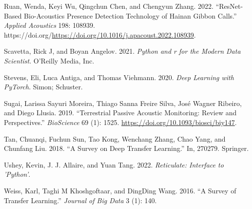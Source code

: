 \documentclass[fleqn,10pt,lineno]{wlpeerj} %
\newlength{\cslhangindent}
\newlength{\cslentryspacingunit} %
\newenvironment{CSLReferences}[2] %
 {%
  \setlength{\parindent}{0pt}
  \ifodd #1
  \let\oldpar\par
  \def\par{\hangindent=\cslhangindent\oldpar}
  \fi
  \setlength{\parskip}{#2\cslentryspacingunit}
 }%
 {}
\begin{document}
\begin{CSLReferences}{1}{0}
\leavevmode{}%
Ruan, Wenda, Keyi Wu, Qingchun Chen, and Chengyun Zhang. 2022.
{``ResNet-Based Bio-Acoustics Presence Detection Technology of Hainan
Gibbon Calls.''} \emph{Applied Acoustics} 198: 108939.
https://doi.org/\url{https://doi.org/10.1016/j.apacoust.2022.108939}.

\leavevmode{}%
Scavetta, Rick J, and Boyan Angelov. 2021. \emph{Python and r for the
Modern Data Scientist}. O'Reilly Media, Inc.

\leavevmode{}%
Stevens, Eli, Luca Antiga, and Thomas Viehmann. 2020. \emph{Deep
Learning with PyTorch}. Simon; Schuster.

\leavevmode{}%
Sugai, Larissa Sayuri Moreira, Thiago Sanna Freire Silva, José Wagner
Ribeiro, and Diego Llusia. 2019. {``Terrestrial Passive Acoustic
Monitoring: Review and Perspectives.''} \emph{BioScience} 69 (1): 1525.
\url{https://doi.org/10.1093/biosci/biy147}.

\leavevmode{}%
Tan, Chuanqi, Fuchun Sun, Tao Kong, Wenchang Zhang, Chao Yang, and
Chunfang Liu. 2018. {``A Survey on Deep Transfer Learning.''} In,
270279. Springer.

\leavevmode{}%
Ushey, Kevin, J. J. Allaire, and Yuan Tang. 2022. \emph{Reticulate:
Interface to 'Python'}.

\leavevmode{}%
Weiss, Karl, Taghi M Khoshgoftaar, and DingDing Wang. 2016. {``A Survey
of Transfer Learning.''} \emph{Journal of Big Data} 3 (1): 140.

\end{CSLReferences}
\end{document}
